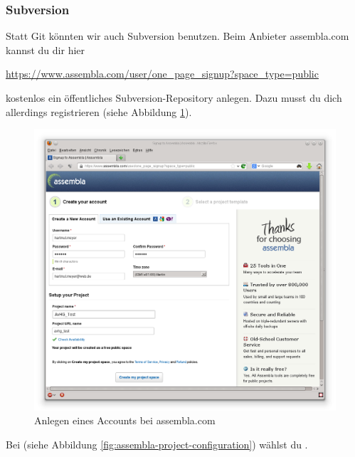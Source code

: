 \afterpage{\clearpage}

\subsubsection{Subversion}

Statt Git könnten wir auch Subversion benutzen. Beim Anbieter assembla.com
kannst du dir hier

\url{https://www.assembla.com/user/one_page_signup?space_type=public}

kostenlos ein öffentliches Subversion-Repository anlegen. Dazu musst du dich
allerdings registrieren (siehe Abbildung \ref{fig:assembla-account-creation}).

\begin{figure}[h]
  \centering
   \includegraphics[width=1.0\textwidth]{./inf/SEKII/01_Vorbereitung/Assembla_Account_Creation.png}
   \caption{Anlegen eines Accounts bei assembla.com}
   \label{fig:assembla-account-creation}
\end{figure}

Bei  (siehe Abbildung
\ref{fig:assembla-project-configuration}) wählst du .

